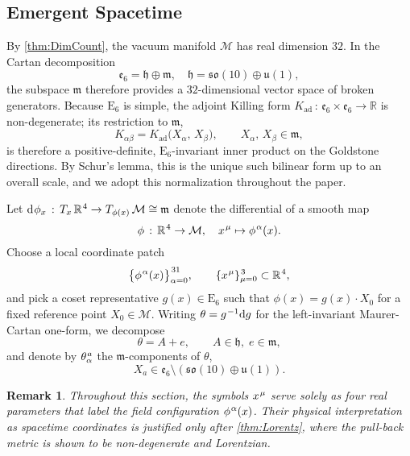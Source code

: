 \documentclass[pdflatex,sn-mathphys-num]{sn-jnl}
\theoremstyle{thmstyleone}
\theoremstyle{thmstyletwo}%
\newtheorem{remark}{Remark}%
\theoremstyle{thmstylethree}%
\newcommand{\E}[1]{\mathrm{E_{#1}}}
\newcommand{\M}{\mathcal{M}}
\newcommand{\ESix}{\E{6}}
\newcommand{\sm}{\hspace{.065em}}
\newcommand{\smexp}[1]{^{\sm #1}}
\begin{document}
\subsection{Emergent Spacetime}
\label{subsec:EmergentSpacetime}

By \autoref{thm:DimCount}, the vacuum manifold $\M$ has real dimension $32$.
In the Cartan decomposition
$$
  \mathfrak e_{6} = \mathfrak h \oplus \mathfrak m,
  \quad
  \mathfrak h = \mathfrak{so}(10)\oplus\mathfrak u(1),
$$
the subspace $\mathfrak m$ therefore provides a $32$-dimensional vector
space of broken generators.
Because $\ESix$ is simple, the adjoint Killing form
$K_{\mathrm{ad}}\,:\,\mathfrak e_{6}\times\mathfrak e_{6}\to\mathbb R$
is non-degenerate; its restriction to $\mathfrak m$,
$$
  K_{\alpha\beta}
  =
  K_{\mathrm{ad}}\bigl(X_{\alpha},\,X_{\beta}\bigr),
  \qquad X_{\alpha},\, X_{\beta}\in\mathfrak m,
$$
is therefore a positive-definite, $\ESix$-invariant inner product on
the Goldstone directions.  By Schur's lemma, this is the unique such bilinear
form up to an overall scale, and we adopt this normalization throughout the paper.

Let
$
  \mathrm d\sm \phi_x \, :\,
  T_{x}\, \mathbb R\smexp{4}\to
  T_{\phi(x)}\,\M
  \cong\mathfrak m
$
denote the differential of a smooth map
$$
  \phi \,:\, \mathbb R\smexp{4}\to\M,
  \quad
  x\smexp{\mu}\mapsto\phi\smexp{\alpha}(x).
$$
Choose a local coordinate patch
$$
  \bigl\{\phi\smexp{\alpha}(x)\bigr\}_{\alpha=0}\smexp{31},
  \qquad
  \{x\smexp{\mu}\}_{\mu=0}\smexp{3}\subset\mathbb R\smexp{4},
$$
and pick a coset representative $g(x)\in\ESix$ such that
$\phi(x)=g(x)\cdot X_{0}$ for a fixed reference point $X_{0}\in\M$.
Writing $\theta=g\smexp{-1}\mathrm d g$ for the left-invariant
Maurer-Cartan one-form, we decompose
$$
  \theta = A + e,
  \qquad
  A\in\mathfrak h,\;
  e\in\mathfrak m,
$$
and denote by
$\theta\smexp{a}_{\alpha}$ the $\mathfrak m$-components of $\theta$,
$$
X_{a}\in
\mathfrak e_{6} \setminus (\mathfrak{so}(10)\oplus\mathfrak u(1)).
$$

\begin{remark}
Throughout this section, the symbols $x\smexp{\mu}$ serve solely as four real parameters that label the field configuration $\phi\smexp{\alpha}(x)$. Their physical interpretation as spacetime coordinates is justified only after \autoref{thm:Lorentz}, where the pull-back metric is shown to be non-degenerate and Lorentzian.
\end{remark}
\end{document}
